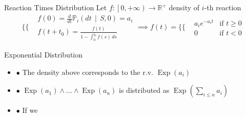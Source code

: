 \documentclass{beamer}
\DeclareMathOperator{\Exp}{\text{Exp}}
\begin{document}
\begin{frame}{Reaction Times Distribution}
  Let $f:\left[0, +\infty\right) \longrightarrow \mathbb{R}^+$ density of $i$-th reaction 
  \begin{equation*}
    \lbrace\{
    \begin{aligned}
      &f(0) = \frac{d}{dt} \mathbb{P}_i \left(dt \, \middle| \, S, 0 \right)= a_i\\
      &f(t + t_0) = \frac{f(t)}{1 - \int_0^{t_0} f(s)\, ds}         
    \end{aligned}
    \implies f(t) = \lbrace\{
    \begin{aligned} 
        & a_i e^{-a_i t}   &\text{if } t \geq 0 \\
        &0 &\text{if } t < 0
    \end{aligned}
  \end{equation*}
  \begin{block}{Exponential Distribution}
    \begin{itemize}
    \item $\bullet$ The density above corresponds to the r.v. $\Exp(a_i)$
    \item $\bullet$ $\Exp(a_1) \land \dots \land \Exp(a_n)$ is distributed as
      $\Exp\left(\sum_{i\leq n} a_i\right)$ 
    \item $\bullet$ If we 
    \end{itemize}
  \end{block}
\end{frame}
\end{document}
